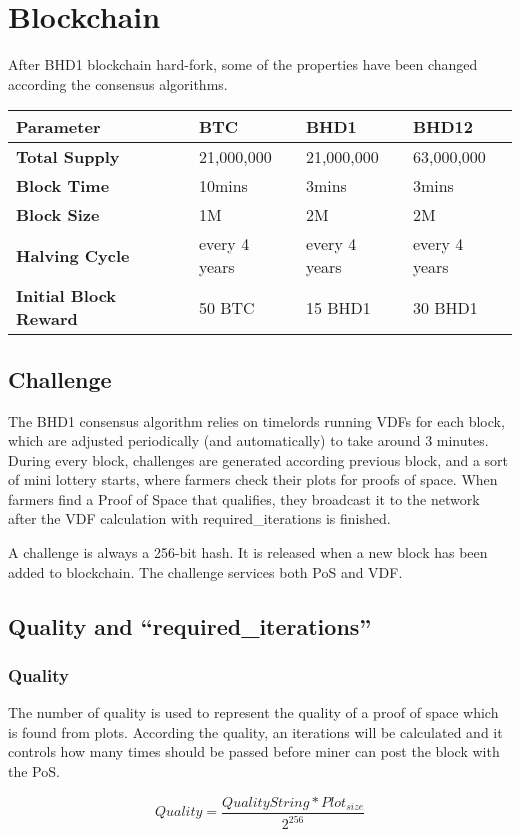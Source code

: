 \section{Blockchain}
\begin{flushleft}
    After BHD1 blockchain hard-fork, some of the properties have been changed according the consensus algorithms.
\end{flushleft}
\begin{tabular}{ p{4cm} p{2.5cm} p{2.5cm} p{2.5cm}  }
    \hline
    \rowcolor{lightgray} \textbf{Parameter} & \textbf{BTC} & \textbf{BHD1} & \textbf{BHD12} \\[5pt]
    \hline
    \textbf{Total Supply} & 21,000,000 & 21,000,000 & 63,000,000 \\[5pt]
    \rowcolor{lightgray!30} \textbf{Block Time} & 10mins & 3mins & 3mins \\[5pt]
    \textbf{Block Size} & 1M & 2M & 2M \\[5pt]
    \rowcolor{lightgray!30} \textbf{Halving Cycle} & every 4 years & every 4 years & every 4 years \\[5pt]
    \textbf{Initial Block Reward} & 50 BTC & 15 BHD1 & 30 BHD1 \\[5pt]
    \hline
\end{tabular}
\subsection{Challenge}
\begin{flushleft}
    The BHD1 consensus algorithm relies on timelords running VDFs for each block, which are adjusted periodically (and automatically) to take around 3 minutes. During every block, challenges are generated according previous block, and a sort of mini lottery starts, where farmers check their plots for proofs of space. When farmers find a Proof of Space that qualifies, they broadcast it to the network after the VDF calculation with required\_iterations is finished.
\end{flushleft}
\begin{flushleft}
    A challenge is always a 256-bit hash. It is released when a new block has been added to blockchain. The challenge services both PoS and VDF.
\end{flushleft}
\subsection{Quality and ``required\_iterations''}
\subsubsection{Quality}
\begin{flushleft}
    The number of quality is used to represent the quality of a proof of space which is found from plots. According the quality, an iterations will be calculated and it controls how many times should be passed before miner can post the block with the PoS.
\end{flushleft}
\begin{equation}
    Quality = \frac{QualityString * Plot_{size}}{2^{256}}
\end{equation}

